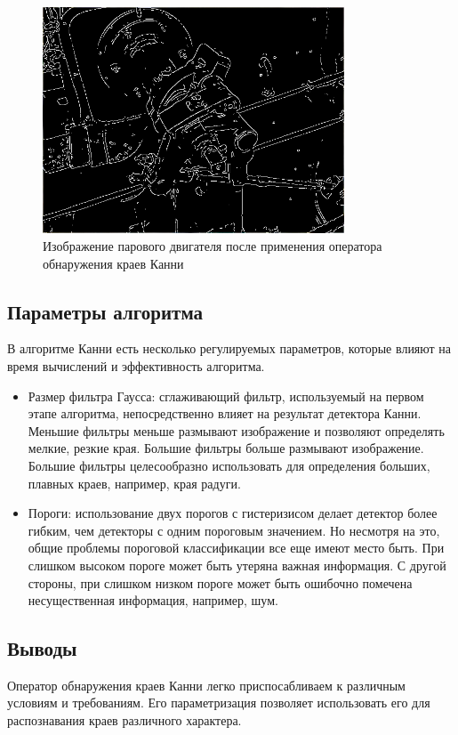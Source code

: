 \begin{figure}
  \centering
  \includegraphics[width=0.8\textwidth]{images/canny-result.png}
  \caption{Изображение парового двигателя после применения оператора обнаружения краев Канни\label{canny-result}}
\end{figure}

\subsection{Параметры алгоритма}
В алгоритме Канни есть несколько регулируемых параметров, которые влияют на время вычислений и эффективность алгоритма.
\begin{itemize}
  \item Размер фильтра Гаусса: сглаживающий фильтр, используемый на первом этапе алгоритма, непосредственно влияет на результат детектора Канни. Меньшие фильтры меньше размывают изображение и позволяют определять мелкие, резкие края. Большие фильтры больше размывают изображение. Большие фильтры целесообразно использовать для определения больших, плавных краев, например, края радуги.
  \item Пороги: использование двух порогов с гистеризисом делает детектор более гибким, чем детекторы с одним пороговым значением. Но несмотря на это, общие проблемы пороговой классификации все еще имеют место быть. При слишком высоком пороге может быть утеряна важная информация. С другой стороны, при слишком низком пороге может быть ошибочно помечена несущественная информация, например, шум.
\end{itemize}

\subsection{Выводы}
Оператор обнаружения краев Канни легко приспосабливаем к различным условиям и требованиям. Его параметризация позволяет использовать его для распознавания краев различного характера.

\newpage
